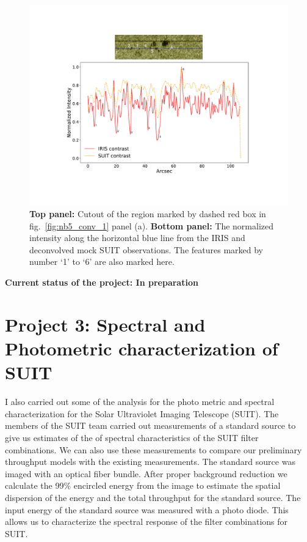 \documentclass[a4paper,11pt]{article}
\begin{document}
\begin{figure}[ht!]
    \centering
    \includegraphics[trim={2cm 3cm 2cm 2cm},clip,width=\textwidth]{SUIT_sunspot_contrast.pdf}
    \caption{\textbf{Top panel:} Cutout of the region marked by dashed red box in fig.~\ref{fig:nb5_conv_1} panel (a). \textbf{Bottom panel:} The normalized intensity along the horizontal blue line from the IRIS and deconvolved mock SUIT observations. The features marked by number `1' to `6' are also marked here.}
\end{figure}

\textbf{Current status of the project: In preparation}

\section*{Project 3: Spectral and Photometric characterization of SUIT}

I also carried out some of the analysis for the photo metric and spectral characterization for the Solar Ultraviolet Imaging Telescope (SUIT). The members of the SUIT team carried out measurements of a standard source to give us estimates of the of spectral characteristics of the SUIT filter combinations. We can also use these measurements to compare our preliminary throughput models with the existing measurements. The standard source was imaged with an optical fiber bundle. After proper background reduction we calculate the 99\% encircled energy from the image to estimate the spatial dispersion of the energy and the total throughput for the standard source. The input energy of the standard source was measured with a photo diode. This allows us to characterize the spectral response of the filter combinations for SUIT.
\end{document}
